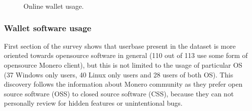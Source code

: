 \documentclass[
  printed, %
  table,   %
  nolof,     %
  nolot,     %
           oneside, color
]{fithesis3}
\begin{document}
\begin{center}
\begin{figure}[H]
\caption{Online wallet usage.}
\label{chart:price}\end{figure}\end{center}

\subsubsection{Wallet software usage}
First section of the survey shows that userbase present in the dataset is more oriented towards opensource software in general (110 out of 113 use some form of opensource Monero client), but this is not limited to the usage of particular OS (37 Windows only users, 40 Linux only users and 28 users of both OS). This discovery follows the information about Monero community as they prefer open source software (OSS) to closed source software (CSS), because they can not personally review for hidden features or unintentional bugs.
\end{document}
